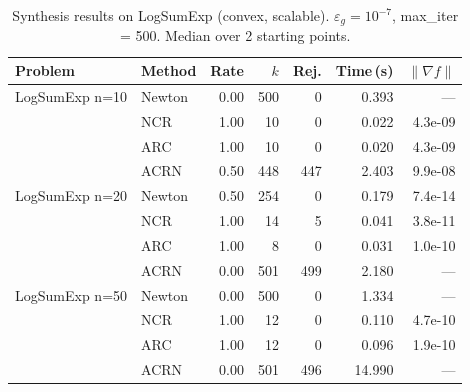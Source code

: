 \begin{table}[ht]
  \centering
  \caption{Synthesis results on LogSumExp (convex, scalable). $\varepsilon_g = 10^{-7}$, max\_iter = 500. Median over 2 starting points.}
  \label{tab:synth_logsumexp}
  \begin{tabular}{|l|l|r|r|r|r|r|}
    \hline
    \textbf{Problem} & \textbf{Method} & \textbf{Rate} & \textbf{$k$} & \textbf{Rej.} & \textbf{Time\,(s)} & \textbf{$\|\nabla f\|$} \\
    \hline\hline
    LogSumExp n=10 & Newton & 0.00 & 500 & 0 & 0.393 & --- \\
     & NCR & 1.00 & 10 & 0 & 0.022 & 4.3e-09 \\
     & ARC & 1.00 & 10 & 0 & 0.020 & 4.3e-09 \\
     & ACRN & 0.50 & 448 & 447 & 2.403 & 9.9e-08 \\
    \hline
    LogSumExp n=20 & Newton & 0.50 & 254 & 0 & 0.179 & 7.4e-14 \\
     & NCR & 1.00 & 14 & 5 & 0.041 & 3.8e-11 \\
     & ARC & 1.00 & 8 & 0 & 0.031 & 1.0e-10 \\
     & ACRN & 0.00 & 501 & 499 & 2.180 & --- \\
    \hline
    LogSumExp n=50 & Newton & 0.00 & 500 & 0 & 1.334 & --- \\
     & NCR & 1.00 & 12 & 0 & 0.110 & 4.7e-10 \\
     & ARC & 1.00 & 12 & 0 & 0.096 & 1.9e-10 \\
     & ACRN & 0.00 & 501 & 496 & 14.990 & --- \\
    \hline
  \end{tabular}
\end{table}